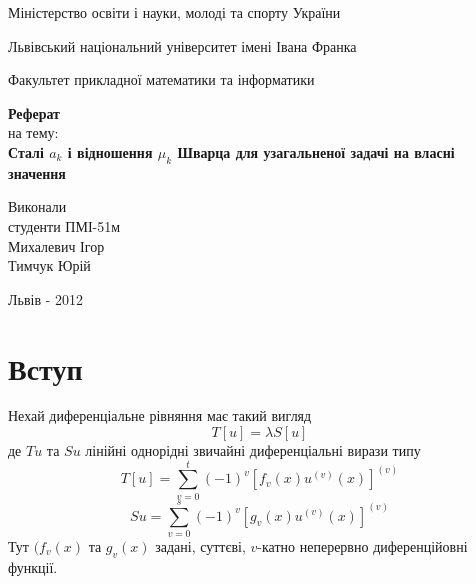 \documentclass[12pt,a4paper]{article}
\begin{document}

\setlength{\parindent}{1.5cm}
\fontsize{14pt}{6mm}\selectfont

\begin{center}
  Міністерство освіти і науки, молоді та спорту України
  
  Львівський національний університет імені Івана Франка

  Факультет прикладної математики та інформатики
\end{center}


\vspace{6cm}

\begin{center}
  {\bfseries\Large Реферат}\\[0.5cm]
  на тему:\\[0.5cm]
  {\bfseries\Large Сталі $a_k$ і відношення $\mu_k$ Шварца для узагальненої задачі на власні значення}\\
\end{center}

\vspace{2cm}

\begin{flushleft}
  Виконали\\
  студенти ПМІ-51м\\
  Михалевич Ігор\\
  Тимчук Юрій
\end{flushleft}

\vspace{6cm}

\begin{center}
  Львів - 2012 
\end{center}

\clearpage

\fontsize{14pt}{6mm}\selectfont

\section{Вступ}

Нехай диференціальне рівняння має такий вигляд
\begin{equation}\label{eq:dfEq}
	T[u] = \lambda S[u]
\end{equation}
де $Tu$ та $Su$ лінійні однорідні звичайні диференціальні вирази типу
\begin{equation}\label{eq:defTu}
	T[u] = \sum_{v=0}^t(-1)^v[f_v(x)u^{(v)}(x)]^{(v)}
\end{equation}
\begin{equation}\label{eq:defSu}
	Su = \sum_{v=0}^s(-1)^v[g_v(x)u^{(v)}(x)]^{(v)}
\end{equation}
Тут $(f_v(x)$ та $g_v(x)$ задані, суттєві, $v$-катно неперервно диференційовні функції. 
\end{document}
